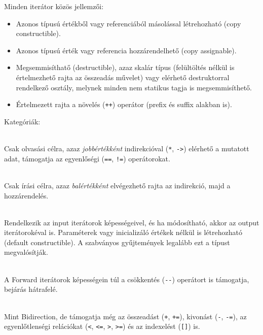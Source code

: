 \begin{frame}
    Minden iterátor közös jellemzői:
    \begin{itemize}
        \item Azonos típusú értékből vagy referenciából másolással létrehozható (copy constructible).
        \item Azonos típusú érték vagy referencia hozzárendelhető (copy assignable).
        \item Megsemmisíthatő (destructible), azaz skalár típus (felültöltés nélkül is értelmezhető rajta az összeadás művelet) vagy elérhető destruktorral rendelkező osztály, melynek minden nem statikus tagja is megsemmisíthető.
        \item Értelmezett rajta a növelés (\texttt{++}) operátor (prefix és suffix alakban is).
    \end{itemize}
\end{frame}

\begin{frame}
    Kategóriák:
    \begin{description}[m]
        \item[Input] \hfill \\ Csak olvasási célra, azaz \emph{jobbértékként} indirekcióval (\texttt{*}, \texttt{->}) elérhető a mutatott adat, támogatja az egyenlőségi (\texttt{==}, \texttt{!=}) operátorokat.
        \item[Output] \hfill \\ Csak írási célra, azaz \emph{balértékként} elvégezhető rajta az indirekció, majd a hozzárendelés.
        \item[Forward] \hfill \\ Rendelkezik az input iterátorok képességeivel, és ha módosítható, akkor az output iterátorokéval is. Paraméterek vagy inicializáló értékek nélkül is létrehozható (default constructible). A szabványos gyűjtemények legalább ezt a típust megvalósítják.
    \end{description}
\end{frame}

\begin{frame}
    \begin{description}[m]
        \small
        \item[Bidirectional] \hfill \\ A Forward iterátorok képességein túl a csökkentés (\texttt{-{-}}) operátort is támogatja, bejárás hátrafelé.
        \item[Random access] \hfill \\ Mint Bidirection, de támogatja még az összeadást (\texttt{+}, \texttt{+=}), kivonást (\texttt{-}, \texttt{-=}), az egyenlőtlenségi relációkat (\texttt{<}, \texttt{<=}, \texttt{>}, \texttt{>=}) és az indexelést (\texttt{[]}) is. 
    \end{description}
    \begin{exampleblock}{}
        \scriptsize
        
    \end{exampleblock}
\end{frame}
